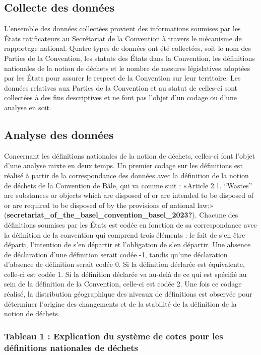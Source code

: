 \documentclass[12pt]{ulaval}
\begin{document}
\subsection{Collecte des données}\label{collecte-des-donnuxe9es}

L'ensemble des données collectées provient des informations soumises par les États ratificateurs au Secrétariat de la Convention à travers le mécanisme de rapportage national. Quatre types de données ont été collectées, soit le nom des Parties de la Convention, les statuts des États dans la Convention, les définitions nationales de la notion de déchets et le nombre de mesures législatives adoptées par les États pour assurer le respect de la Convention sur leur territoire. Les données relatives aux Parties de la Convention et au statut de celles-ci sont collectées à des fins descriptives et ne font pas l'objet d'un codage ou d'une analyse en soit.

\subsection{Analyse des données}\label{analyse-des-donnuxe9es}

Concernant les définitions nationales de la notion de déchets, celles-ci font l'objet d'une analyse mixte en deux temps. Un premier codage sur les définitions est réalisé à partir de la correspondance des données avec la définition de la notion de déchets de la Convention de Bâle, qui va comme suit : «Article 2.1. ``Wastes'' are substances or objects which are disposed of or are intended to be disposed of or are required to be disposed of by the provisions of national law;» (\textbf{secretariat\_of\_the\_basel\_convention\_basel\_2023?}). Chacune des définitions soumises par les États est codée en fonction de sa correspondance avec la définition de la convention qui comprend trois éléments : le fait de s'en être départi, l'intention de s'en départir et l'obligation de s'en départir. Une absence de déclaration d'une définition serait codée -1, tandis qu'une déclaration d'absence de définition serait codée 0. Si la définition déclarée est équivalente, celle-ci est codée 1. Si la définition déclarée va au-delà de ce qui est spécifié au sein de la définition de la Convention, celle-ci est codée 2. Une fois ce codage réalisé, la distribution géographique des niveaux de définitions est observée pour déterminer l'origine des changements et de la stabilité de la définition de la notion de déchets.

\subsubsection{Tableau 1 : Explication du système de cotes pour les définitions nationales de déchets}\label{tableau-1-explication-du-systuxe8me-de-cotes-pour-les-duxe9finitions-nationales-de-duxe9chets}
\end{document}
